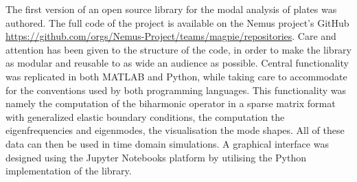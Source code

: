 The first version of an open source library for the modal analysis of plates was authored. The full code of the project is available on the Nemus project's GitHub \url{https://github.com/orgs/Nemus-Project/teams/magpie/repositories}. Care and attention has been given to the structure of the code, in order to make the library as modular and reusable to as wide an audience as possible. Central functionality was replicated in both MATLAB and Python, while taking care to accommodate for the conventions used by both programming languages. This functionality was namely the computation of the biharmonic operator in a sparse matrix format with generalized elastic boundary conditions, the computation the eigenfrequencies and eigenmodes, the visualisation the mode shapes. All of these data can then be used in time domain simulations. A graphical interface was designed using the Jupyter Notebooks platform by utilising the Python implementation of the library. \\  


